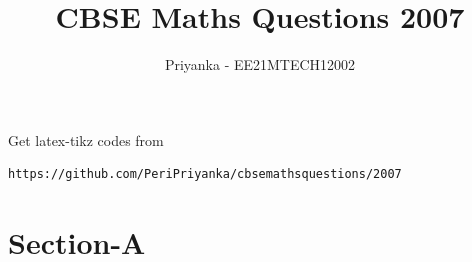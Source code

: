 \documentclass[journal,12pt,twocolumn]{IEEEtran}
\begin{document}
     \def\rightbox#1{\makebox[0in][r]{#1}}
     \def\centbox#1{\makebox[0in]{#1}}
     \def\topbox#1{\raisebox{-\baselineskip}[0in][0in]{#1}}
     \def\midbox#1{\raisebox{-0.5\baselineskip}[0in][0in]{#1}}
\vspace{3cm}
\title{CBSE Maths Questions 2007}
\author{Priyanka - EE21MTECH12002}
\maketitle
\newpage
\bigskip
\renewcommand{\thefigure}{\theenumi}
\renewcommand{\thetable}{\theenumi}
%
Get latex-tikz codes from 
%
\begin{lstlisting}
https://github.com/PeriPriyanka/cbsemathsquestions/2007
\end{lstlisting}
\section{Section-A}
\end{document}
